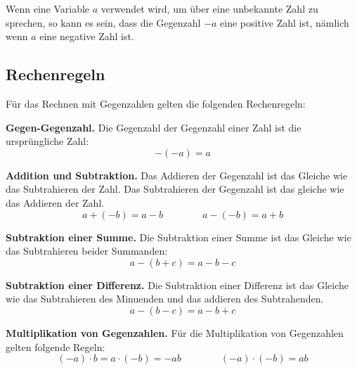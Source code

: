 Wenn eine Variable $a$ verwendet wird, um über eine unbekannte Zahl zu sprechen, so kann es sein, dass die Gegenzahl $-a$ eine positive Zahl ist, nämlich wenn $a$ eine negative Zahl ist.

\subsection{Rechenregeln}

Für das Rechnen mit Gegenzahlen gelten die folgenden Rechenregeln:
\begin{theorem}
  \textbf{Gegen-Gegenzahl.} Die Gegenzahl der Gegenzahl einer Zahl ist die ursprüngliche Zahl:
  \[
    -(-a) = a
  \]
\end{theorem}
\begin{theorem}
  \textbf{Addition und Subtraktion.} Das Addieren der Gegenzahl ist das Gleiche wie das Subtrahieren der Zahl. Das Subtrahieren der Gegenzahl ist das gleiche wie das Addieren der Zahl.
  \[
    a+(-b) = a-b \qquad\qquad a-(-b) = a+b
  \]
\end{theorem}
\begin{theorem}
  \textbf{Subtraktion einer Summe.} Die Subtraktion einer Summe ist das Gleiche wie das Subtrahieren beider Summanden:
  \[
    a-(b+c) = a-b-c
  \]
\end{theorem}
\begin{theorem}
  \textbf{Subtraktion einer Differenz.} Die Subtraktion einer Differenz ist das Gleiche wie das Subtrahieren des Minuenden und das addieren des Subtrahenden.
  \[
    a-(b-c) = a-b+c
  \]
\end{theorem}
\begin{theorem}
  \textbf{Multiplikation von Gegenzahlen.} Für die Multiplikation von Gegenzahlen gelten folgende Regeln:
  \[
    (-a)\cdot b = a\cdot(-b) = -ab \qquad\qquad  (-a)\cdot(-b) = ab
  \]
\end{theorem}

